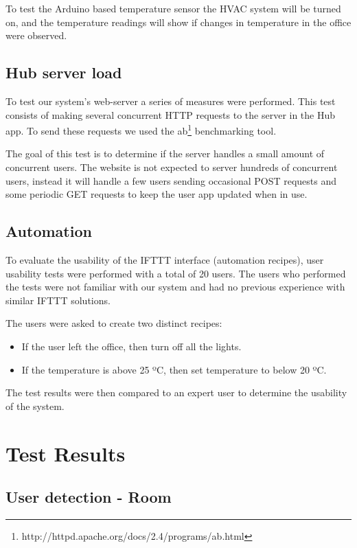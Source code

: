 To test the Arduino based temperature sensor the \ac{HVAC} system will be turned on, and the temperature readings will show if changes in temperature in the office were observed.


\subsection{Hub server load}


To test our system's web-server a series of measures were performed. This test consists of making several concurrent \ac{HTTP} requests to the server in the Hub app. To send these requests we used the \ac{ab}\footnote{http://httpd.apache.org/docs/2.4/programs/ab.html} benchmarking tool.

The goal of this test is to determine if the server handles a small amount of concurrent users. The website is not expected to server hundreds of concurrent users, instead it will handle a few users sending occasional POST requests and some periodic GET requests to keep the user app updated when in use.


\subsection{Automation}

To evaluate the usability of the \ac{IFTTT} interface (automation recipes), user usability tests were performed with a total of 20 users. The users who performed the tests were not familiar with our system and had no previous experience with similar \ac{IFTTT} solutions.

The users were asked to create two distinct recipes:

\begin{itemize}
  \item If the user left the office, then turn off all the lights.
  \item If the temperature is above 25 ºC, then set temperature to below 20 ºC. 
\end{itemize} 

The test results were then compared to an expert user to determine the usability of the system.



\section{Test Results}


\subsection{User detection - Room}


